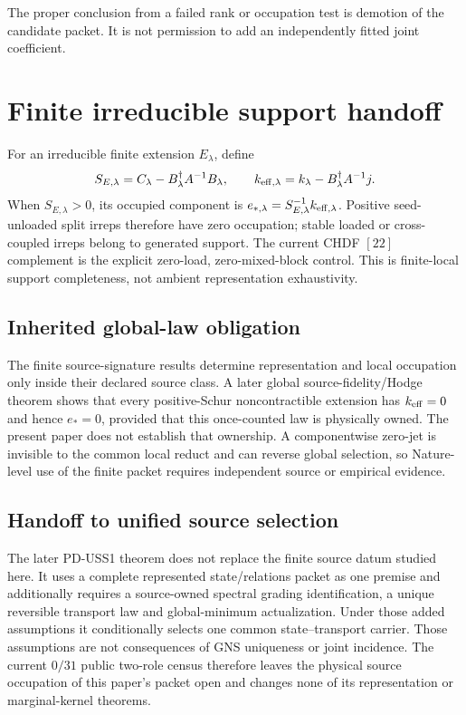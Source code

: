 \documentclass[11pt]{article}
\begin{document}
The proper conclusion from a failed rank or occupation test is demotion of the
candidate packet.  It is not permission to add an independently fitted joint
coefficient.

\section{Finite irreducible support handoff}

For an irreducible finite extension \(E_\lambda\), define
\[
 S_{E,\lambda}=C_\lambda-B_\lambda^\dagger A^{-1}B_\lambda,
 \qquad
 k_{{\rm eff},\lambda}=k_\lambda-B_\lambda^\dagger A^{-1}j.
\]
When \(S_{E,\lambda}>0\), its occupied component is
\(e_{*,\lambda}=S_{E,\lambda}^{-1}k_{{\rm eff},\lambda}\).
Positive seed-unloaded split irreps therefore have zero occupation; stable
loaded or cross-coupled irreps belong to generated support. The current CHDF
\([22]\) complement is the explicit zero-load, zero-mixed-block control. This
is finite-local support completeness, not ambient representation exhaustivity.

\subsection*{Inherited global-law obligation}

The finite source-signature results determine representation and local
occupation only inside their declared source class.  A later global
source-fidelity/Hodge theorem shows that every positive-Schur
noncontractible extension has \(k_{\rm eff}=0\) and hence \(e_*=0\), provided
that this once-counted law is physically owned.  The present paper does not
establish that ownership.  A componentwise zero-jet is invisible to the
common local reduct and can reverse global selection, so Nature-level use of
the finite packet requires independent source or empirical evidence.

\subsection*{Handoff to unified source selection}

The later PD-USS1 theorem does not replace the finite source datum studied
here. It uses a complete represented state/relations packet as one premise
and additionally requires a source-owned spectral grading identification, a
unique reversible transport law and global-minimum actualization. Under
those added assumptions it conditionally selects one common state--transport
carrier. Those assumptions are not consequences of GNS uniqueness or joint
incidence. The current $0/31$ public two-role census therefore leaves the
physical source occupation of this paper's packet open and changes none of
its representation or marginal-kernel theorems.
\end{document}
